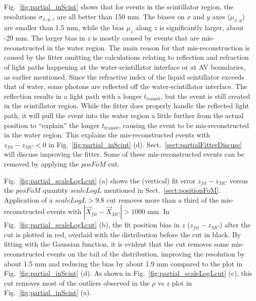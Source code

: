 Fig.~\ref{fig:partial_inScint} shows that for events in the scintillator region, the resolutions $\sigma_{x,y,z}$ are all better than 150 mm. The biases on $x$ and $y$ axes ($\mu_{x,y}$) are smaller than 1.5 mm, while the bias $\mu_z$ along $z$ is significantly larger, about -29 mm. The larger bias in $z$ is mostly caused by events that are mis-reconstructed in the water region. The main reason for that mis-reconstruction is caused by the fitter omitting the calculations relating to reflection and refraction of light paths happening at the water-scintillator interface or at AV boundaries, as earlier mentioned. Since the refractive index of the liquid scintillator exceeds that of water, some photons are reflected off the water-scintillator interface. The reflection results in a light path with a longer $t_\mathrm{transit}$, but the event is still created in the scintillator region. While the fitter does properly handle the reflected light path, it will pull the event into the water region a little further from the actual position to ``explain'' the longer $t_\mathrm{transit}$, causing the event to be mis-reconstructed in the water region. This explains the mis-reconstructed events with $z_{fit}-z_{MC}<0$ in Fig.~\ref{fig:partial_inScint} (d). Sect.~\ref{sect:partialFitterDiscuss} will discuss improving the fitter. Some of these mis-reconstructed events can be removed by applying the $posFoM$ cut.

Fig.~\ref{fig:partial_scaleLogLcut} (a) shows the (vertical) fit error $z_{fit}-z_{MC}$ versus the $posFoM$ quantity $scaleLogL$ mentioned in Sect.~\ref{sect:positionFoM}. Application of a $scaleLogL>9.8$ cut removes more than a third of the mis-reconstructed events with $|\vec{X}_{fit}-\vec{X}_{MC}|>1000$ mm. In Fig.~\ref{fig:partial_scaleLogLcut} (b), the fit position bias in $z$ ($z_{fit}-z_{MC}$) after the cut is plotted in red, overlaid with the distribution before the cut in black. By fitting with the Gaussian function, it is evident that the cut removes some mis-reconstructed events on the tail of the distribution, improving the resolution by about 1.5 mm and reducing the bias by about 1.9 mm compared to the plot in Fig.~\ref{fig:partial_inScint} (d). As shown in Fig.~\ref{fig:partial_scaleLogLcut} (c), this cut removes most of the outliers observed in the $\rho$ vs $z$ plot in Fig.~\ref{fig:partial_inScint} (a).

